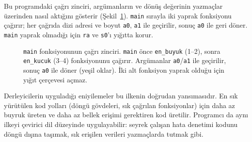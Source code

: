 Bu programdaki çağrı zinciri, argümanların ve dönüş değerinin yazmaçlar üzerinden nasıl aktığını gösterir (Şekil~\ref{fig:cagri-zinciri}). \texttt{main} sırayla iki yaprak fonksiyonu çağırır; her çağrıda dizi adresi ve boyut \texttt{a0}, \texttt{a1} ile geçirilir, sonuç \texttt{a0} ile geri döner. \texttt{main} yaprak olmadığı için \texttt{ra} ve \texttt{s0}'ı yığıtta korur.

\begin{figure}[htbp]
\centering
{}
\caption[Çok fonksiyonlu programda çağrı zinciri]{\texttt{main} fonksiyonunun çağrı zinciri. \texttt{main} önce \texttt{en\_buyuk} (1--2), sonra \texttt{en\_kucuk} (3--4) fonksiyonunu çağırır. Argümanlar \texttt{a0}/\texttt{a1} ile geçirilir, sonuç \texttt{a0} ile döner (yeşil oklar). İki alt fonksiyon yaprak olduğu için yığıt çerçevesi açmaz.}
\label{fig:cagri-zinciri}
\end{figure}


\begin{tanim}
Derleyicilerin uyguladığı eniyilemeler bu ilkenin doğrudan yansımasıdır. En sık yürütülen kod yolları (döngü gövdeleri, sık çağrılan fonksiyonlar) için daha az buyruk üreten ve daha az bellek erişimi gerektiren kod üretilir. Programcı da aynı ilkeyi çevirici dil düzeyinde uygulayabilir: seyrek çalışan hata denetimi kodunu döngü dışına taşımak, sık erişilen verileri yazmaçlarda tutmak gibi.
\end{tanim}

